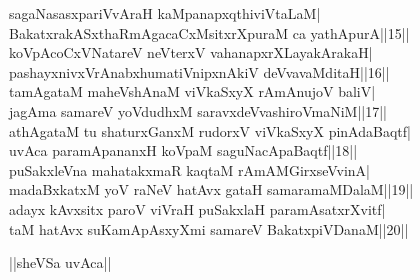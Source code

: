 \documentclass{article}
\begin{document}
sagaNasasxpariVvAraH kaMpanapxqthiviVtaLaM|\\
BakatxrakASxthaRmAgacaCxMsitxrXpuraM ca yathApurA||15||\\
koVpAcoCxVNatareV neVterxV vahanapxrXLayakArakaH|\\
pashayxnivxVrAnabxhumatiVnipxnAkiV deVvavaMditaH||16||\\
tamAgataM maheVshAnaM viVkaSxyX rAmAnujoV baliV|\\
jagAma samareV yoVdudhxM saravxdeVvashiroVmaNiM||17||\\
athAgataM tu shaturxGanxM rudorxV viVkaSxyX pinAdaBaqtf|\\
uvAca paramApananxH koVpaM saguNacApaBaqtf||18||\\
puSakxleVna mahatakxmaR kaqtaM rAmAMGirxseVvinA|\\
madaBxkatxM yoV raNeV hatAvx gataH samaramaMDalaM||19||\\
adayx kAvxsitx paroV viVraH puSakxlaH paramAsatxrXvitf|\\
taM hatAvx suKamApAsxyXmi samareV BakatxpiVDanaM||20||\\

\begin{center}
||sheVSa uvAca||
\end{center}
\end{document}
